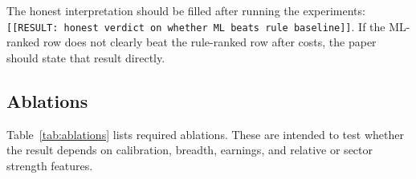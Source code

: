\documentclass[11pt]{article}
\begin{document}
\begin{table}[ht]
\centering
\caption{Baseline comparison for top-$N$ selection after costs.}
\label{tab:economic}
\small
{}
\end{table}

The honest interpretation should be filled after running the experiments:
\texttt{[[RESULT: honest verdict on whether ML beats rule baseline]]}. If the
ML-ranked row does not clearly beat the rule-ranked row after costs, the paper
should state that result directly.

\subsection{Ablations}

Table~\ref{tab:ablations} lists required ablations. These are intended to test
whether the result depends on calibration, breadth, earnings, and relative or
sector strength features.
\end{document}
